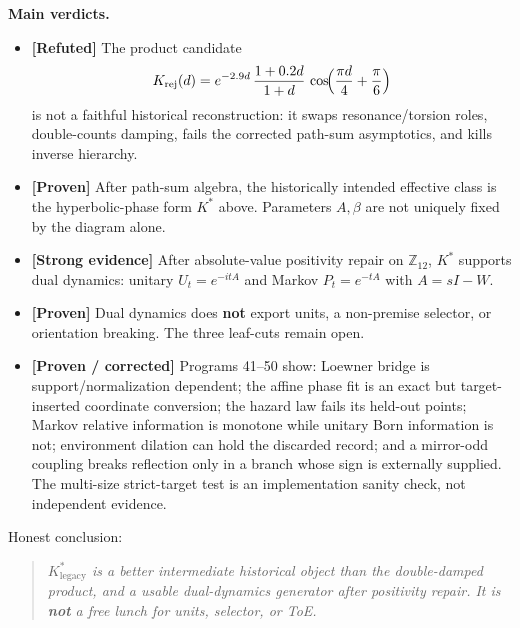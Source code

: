 \documentclass[11pt,a4paper,openany]{report}
\newcommand{\statusProven}{\textcolor{fingreen}{[Proven]}}
\newcommand{\statusStrong}{\textcolor{finblue}{[Strong evidence]}}
\newcommand{\statusRefuted}{\textcolor{finred}{[Refuted]}}
\begin{document}
\textbf{Main verdicts.}

\begin{itemize}
\item 
\textbf{\statusRefuted{}} The product candidate \[
  K_{\mathrm{rej}}(d)
  =
  e^{-2.9d}\,\frac{1+0.2d}{1+d}\,
  \cos\!\Bigl(\frac{\pi d}{4}+\frac{\pi}{6}\Bigr)
  \] is not a faithful historical reconstruction: it swaps resonance/\allowbreak{}torsion roles, double-counts damping, fails the corrected path-sum asymptotics, and kills inverse hierarchy.

\item 
\textbf{\statusProven{}} After path-sum algebra, the historically intended effective class is the hyperbolic-phase form \(K^*\) above. Parameters \(A,\beta\) are not uniquely fixed by the diagram alone.

\item 
\textbf{\statusStrong{}} After absolute-value positivity repair on \(\mathbb Z_{12}\), \(K^*\) supports dual dynamics: unitary \(U_t=e^{-itA}\) and Markov \(P_t=e^{-tA}\) with \(A=sI-W\).

\item 
\textbf{\statusProven{}} Dual dynamics does \textbf{not} export units, a non-premise selector, or orientation breaking. The three leaf-cuts remain open.

\item 
\textbf{[Proven /\allowbreak{} corrected]} Programs 41–50 show: Loewner bridge is support/\allowbreak{}normalization dependent; the affine phase fit is an exact but target-inserted coordinate conversion; the hazard law fails its held-out points; Markov relative information is monotone while unitary Born information is not; environment dilation can hold the discarded record; and a mirror-odd coupling breaks reflection only in a branch whose sign is externally supplied. The multi-size strict-target test is an implementation sanity check, not independent evidence.

\end{itemize}

Honest conclusion:

\begin{quote}\itshape
\(K^*_{\mathrm{legacy}}\) is a better intermediate historical object than the double-damped product, and a usable dual-dynamics generator after positivity repair. It is \textbf{not} a free lunch for units, selector, or ToE.

\end{quote}
\end{document}
